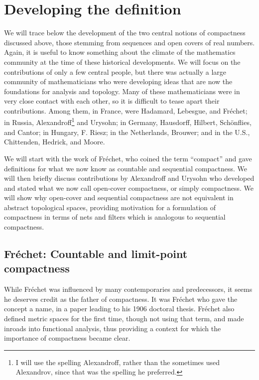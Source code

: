 \documentclass[12pt]{article}
\begin{document}


\section{Developing the definition}

We will trace below the development of the two central notions of compactness
discussed above, those stemming from sequences and open covers of real numbers. 
Again, it is useful to know something about the climate of the mathematics community
at the time of these historical developments. We will focus on the contributions of
only a few central people, but there was actually a large community of mathematicians
who were developing ideas that are now the foundations for analysis and topology. 
Many of these mathematicians were in very close contact with each other, so it is difficult 
to tease apart their contributions. Among them, in France, were Hadamard, Lebesgue, and Fr\'{e}chet; in Russia, Alexandroff\footnote{I will use the spelling Alexandroff, rather than the sometimes used Alexandrov, since that 
was the spelling he preferred.} and Urysohn; in Germany, Hausdorff, Hilbert, Sch\"{o}nflies, and Cantor; in Hungary, F. Riesz; in the Netherlands, Brouwer; and in the U.S., Chittenden, Hedrick, and Moore.  

We will start with the work of Fr\'{e}chet, who coined the term ``compact'' and gave
definitions for what we now know as countable and sequential compactness. We will
then briefly discuss contributions by Alexandroff and Urysohn who developed and stated
what we now call open-cover compactness, or simply compactness. We will show why open-cover and sequential compactness are
not equivalent in abstract topological spaces, providing motivation for a formulation of compactness 
in terms of nets and filters which is analogous to sequential compactness.

\subsection{Fr\'{e}chet: Countable and limit-point compactness}

While Fr\'{e}chet was influenced by many contemporaries and predecessors, it seems he
deserves credit as the father of compactness. It was Fr\'{e}chet who gave the concept a name, 
in a paper \cite{fre1} leading to his 1906 doctoral thesis. Fr\'{e}chet also defined metric spaces for the first time, though not using that term,
 and made inroads into functional analysis, thus providing a context for which the importance of 
 compactness became clear.
\end{document}
